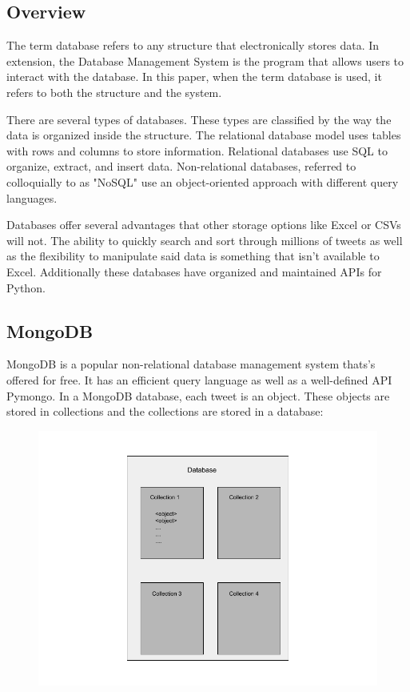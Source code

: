 \documentclass[11pt, twoside, reqno]{book}
\begin{document}
\subsection{Overview}
The term database refers to any structure that electronically stores data. In extension, the Database Management System is the program that allows users to interact with the database. In this paper, when the term database is used, it refers to both the structure and the system. 

There are several types of databases. These types are classified by the way the data is organized inside the structure. The relational database model uses tables with rows and columns to store information. Relational databases use SQL to organize, extract, and insert data. Non-relational databases, referred to colloquially to as "NoSQL" use an object-oriented approach with different query languages. 

Databases offer several advantages that other storage options like Excel or CSVs will not. The ability to quickly search and sort through millions of tweets as well as the flexibility to manipulate said data is something that isn't available to Excel. Additionally these databases have organized and maintained APIs for Python. 

\subsection{MongoDB}
\hspace{0.2in} MongoDB is a popular non-relational database management system thats's offered for free. It has an efficient query language as well as a well-defined API Pymongo. In a MongoDB database, each tweet is an object. These objects are stored in collections and the collections are stored in a database:

\begin{figure}[h]
	\includegraphics[scale=0.5]{database}
\end{figure}
\end{document}
